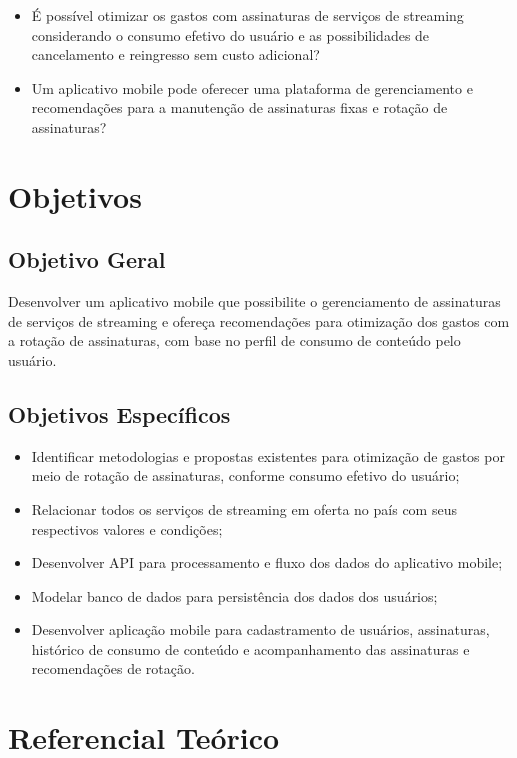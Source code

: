 \documentclass[conference]{IEEEtran}
\begin{document}
\begin{itemize}
\item É possível otimizar os gastos com assinaturas de serviços de streaming considerando o consumo efetivo do usuário e as possibilidades de cancelamento e reingresso sem custo adicional?
\item Um aplicativo mobile pode oferecer uma plataforma de gerenciamento e recomendações para a manutenção de assinaturas fixas e rotação de assinaturas?
\end{itemize}

\section{Objetivos}

\subsection{Objetivo Geral}

Desenvolver um aplicativo mobile que possibilite o gerenciamento de assinaturas de serviços de streaming e ofereça recomendações para otimização dos gastos com a rotação de assinaturas, com base no perfil de consumo de conteúdo pelo usuário.

\subsection{Objetivos Específicos}
\begin{itemize}
\item Identificar metodologias e propostas existentes para otimização de gastos por meio de rotação de assinaturas, conforme consumo efetivo do usuário;
\item Relacionar todos os serviços de streaming em oferta no país com seus respectivos valores e condições;
\item Desenvolver API para processamento e fluxo dos dados do aplicativo mobile;
\item Modelar banco de dados para persistência dos dados dos usuários;
\item Desenvolver aplicação mobile para cadastramento de usuários, assinaturas, histórico de consumo de conteúdo e acompanhamento das assinaturas e recomendações de rotação.
\end{itemize}

\section{Referencial Teórico}
\end{document}
